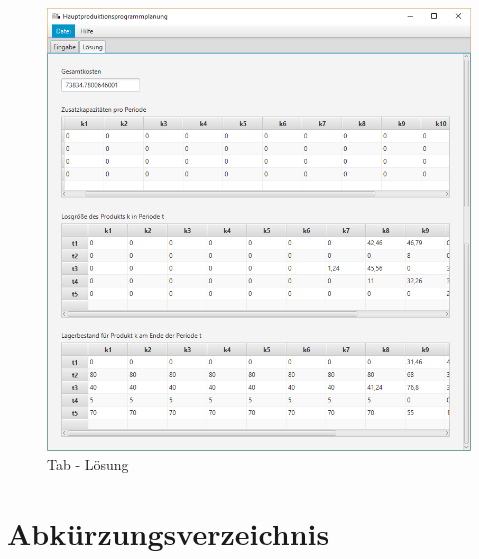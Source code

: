\documentclass[12pt,a4paper, listof=entryprefix, bibliography=totocnumbered,toc=listofnumbered,lof=listofnumbered]{scrartcl}
\newcounter{verzeichnis}
\begin{document}
\begin{figure}[H]
	\centering
	\includegraphics[width=1.0\linewidth]{images/loesung.png} 
	\caption{Tab - Lösung}
	\label{fig:loesung}
\end{figure}

\pagebreak

%
	
	\listoffigures
	\pagebreak
	
	
	\section{Abkürzungsverzeichnis}
	\vspace{-6em} %
	\printnoidxglossary[type=\acronymtype,style=alttree,title=,toctitle=]
\end{document}

